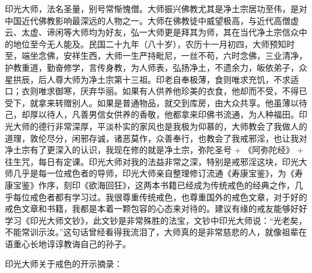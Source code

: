 印光大师，法名圣量，别号常惭愧僧。大师振兴佛教尤其是净土宗居功至伟，是对中国近代佛教影响最深远的人物之一。大师在佛教徒中威望极高，与近代高僧虚云、太虚、谛闲等大师均为好友，弘一大师更是拜其为师，其在当代净土宗信众中的地位至今无人能及。民国二十九年（八十岁），农历十一月初四，大师预知时至，端坐念佛，安祥生西，大师一生严持毗尼，一丝不苟，六时念佛，三业清净，护教重道，勤奋修学，言传身教，为人师表，弘扬净土，不遗余力，皈依弟子，众星拱辰，后人尊大师为净土宗第十三祖。印老自奉极薄，食则唯求充饥，不求适口；衣则唯求御寒，厌弃华丽。如果有人供养他珍美的衣食，他却而不受，不得已受下，就拿来转赠别人。如果是普通物品，就交到库房，由大众共享。他虽薄以待己，却厚以待人，凡善男信女供养的香敬，他都拿来印佛书流通，为人种福田。印光大师的德行非常深厚，平淡朴实的家风也是我极为仰慕的，大师教会了我做人的道理，敦伦尽分，闲邪存诚，诸恶莫作，众善奉行，也教会了我戒邪淫，也让我对净土宗有了更深入的认识，我现在修的就是净土宗，弥陀圣号 + 《阿弥陀经》 + 往生咒，每日有定课。印光大师对我的法益非常之深，特别是戒邪淫这块，印光大师几乎是每一位戒色者的导师，印光大师亲自整理修订流通《寿康宝鉴》，为《寿康宝鉴》作序，刻印《欲海回狂》，这两本书籍已经成为传统戒色的经典之作，几乎每位戒色者都有学习过。我很尊重传统戒色，也尊重国外的戒色文章，对于好的戒色文章和书籍，我都是本着一颗包容的心态来对待的。建议有缘的戒友能够好好学习《印光大师文钞》，此文钞是非常殊胜的法宝，文钞中印光大师说：“光老矣，不能常训示汝。”这句话曾经看得我流泪了，大师真的是非常慈悲的人，就像祖辈在语重心长地谆谆教诲自己的孙子。

印光大师关于戒色的开示摘录：

